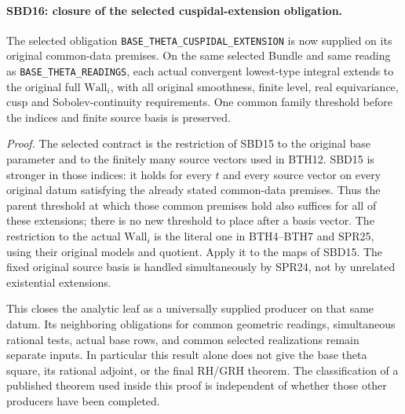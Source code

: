 \documentclass[11pt,a4paper]{article}
\numberwithin{equation}{section}
\theoremstyle{remark}\newtheorem{remark}[theorem]{Remark}
\begin{document}
\paragraph{SBD16: closure of the selected cuspidal-extension obligation.}
\label{claim:SBD16}
The selected obligation \texttt{BASE\_\allowbreak THETA\_\allowbreak CUSPIDAL\_\allowbreak EXTENSION}
is now supplied on its original common-data premises.  On
the same selected Bundle and same reading as
\texttt{BASE\_\allowbreak THETA\_\allowbreak READINGS}, each actual convergent
lowest-type integral extends to the original full
\(\mathrm{Wall}_i\), with all original smoothness, finite
level, real equivariance, cusp and Sobolev-continuity
requirements.  One common family threshold before the
indices and finite source basis is preserved.

\emph{Proof.}
The selected contract is the restriction of SBD15 to the
original base parameter and to the finitely many source
vectors used in BTH12.  SBD15 is stronger in those indices:
it holds for every \(t\) and every source vector on every
original datum satisfying the already stated common-data
premises.  Thus the parent threshold at which those common
premises hold also suffices for all of these extensions;
there is no new threshold to place after a basis vector.
The restriction to the actual \(\mathrm{Wall}_i\) is the
literal one in BTH4--BTH7 and SPR25, using their original
models and quotient.  Apply it to the maps of SBD15.  The
fixed original source basis is handled simultaneously by
SPR24, not by unrelated existential extensions.

This closes the analytic leaf as a universally supplied
producer on that same datum.  Its neighboring obligations
for common geometric readings, simultaneous rational
tests, actual base rows, and common selected realizations
remain separate inputs.  In particular this result alone
does not give the base theta square, its rational adjoint,
or the final RH/GRH theorem.  The classification of a
published theorem used inside this proof is independent
of whether those other producers have been completed.
\end{document}
